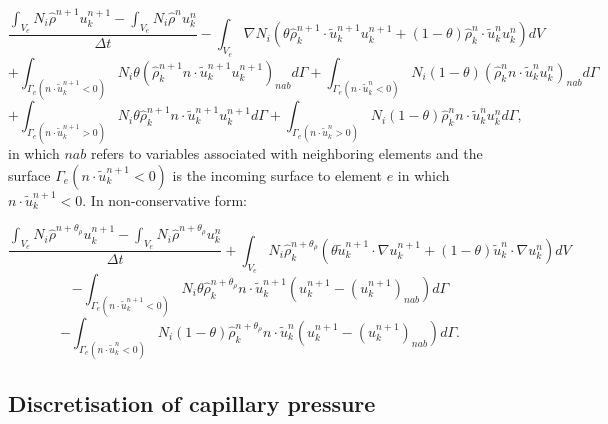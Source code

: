 \begin{equation}
\frac{
\int_{V_e} N_i \hat\rho^{n+1} u^{n+1}_k -
\int_{V_e} N_i \hat\rho^{n} u^{n}_k }
{\Delta t} 
- 
\int_{V_e} \nabla N_i 
(\theta \hat\rho_k^{n+1} \cdot \tilde u_k^{n+1} u_k^{n+1} +
(1-\theta) \hat\rho_k^{n} \cdot \tilde u_k^{n} u_k^{n} ) dV 
\label{inertia-disc-cons-1} 
\end{equation}
\begin{equation}
+ 
\int_{\Gamma_e (n\cdot \tilde u_k^{n+1}<0)} 
 N_i \theta ( \hat\rho_k^{n+1} n\cdot \tilde u_k^{n+1}  
u_k^{n+1})_{nab}  d\Gamma 
+ 
\int_{\Gamma_e (n\cdot \tilde u_k^{n}<0)} 
 N_i(1-\theta) (\hat\rho_k^{n} n\cdot \tilde u_k^{n} 
u_k^{n})_{nab}  d\Gamma 
\label{inertia-disc-cons-2} 
\end{equation}
\begin{equation}
+ 
\int_{\Gamma_e (n\cdot \tilde u_k^{n+1}>0)} N_i 
\theta  \hat\rho_k^{n+1} 
n\cdot \tilde u_k^{n+1}    u_k^{n+1}  d\Gamma
+ 
\int_{\Gamma_e (n\cdot \tilde u_k^{n}>0)} N_i 
 (1-\theta) \hat\rho_k^{n} n\cdot \tilde u_k^{n}  u_k^{n} d\Gamma ,
\label{inertia-disc-cons-3} 
\end{equation}
in which $nab$ refers to variables associated 
with neighboring elements and the surface 
$\Gamma_e (n\cdot \tilde u_k^{n+1}<0)$ is 
the incoming surface to 
element $e$ in which 
$n\cdot \tilde u_k^{n+1}<0$. 
In non-conservative form: 


\begin{equation}
\frac{
\int_{V_e} N_i \hat\rho^{n+\theta_\rho} u^{n+1}_k -
\int_{V_e} N_i \hat\rho^{n+\theta_\rho} u^{n}_k }
{\Delta t} 
+ 
\int_{V_e} N_i \hat\rho_k^{n+\theta_\rho}
(\theta  \tilde u_k^{n+1} \cdot\nabla u_k^{n+1} +
(1-\theta)  \tilde u_k^{n} \cdot\nabla u_k^{n} ) dV 
\label{inertia-disc-non-cons-1} 
\end{equation}
\begin{equation}
- 
\int_{\Gamma_e (n\cdot \tilde u_k^{n+1}<0)} 
N_i \theta \hat\rho_k^{n+\theta_\rho} n\cdot \tilde u_k^{n+1} (u_k^{n+1} - (u_k^{n+1})_{nab} ) d\Gamma 
\label{inertia-disc-non-cons-2} 
\end{equation}
\begin{equation}
- 
\int_{\Gamma_e (n\cdot \tilde u_k^{n}<0)} N_i (1-\theta)\hat\rho_k^{n+\theta_\rho} n\cdot \tilde u_k^{n}  (u_k^{n+1} - (u_k^{n+1})_{nab} ) d\Gamma . 
\label{inertia-disc-non-cons-3} 
\end{equation}

										
\subsection{Discretisation of capillary pressure} 

